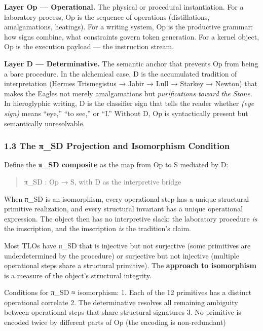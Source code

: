 \textbf{Layer Op --- Operational.} The physical or procedural
instantiation. For a laboratory process, Op is the sequence of
operations (distillations, amalgamations, heatings). For a writing
system, Op is the productive grammar: how signs combine, what
constraints govern token generation. For a kernel object, Op is the
execution payload --- the instruction stream.

\textbf{Layer D --- Determinative.} The semantic anchor that prevents Op
from being a bare procedure. In the alchemical case, D is the
accumulated tradition of interpretation (Hermes Trismegistus → Jabir →
Lull → Starkey → Newton) that makes the Eagles not merely amalgamations
but \emph{purifications toward the Stone}. In hieroglyphic writing, D is
the classifier sign that tells the reader whether \emph{(eye sign)} means ``eye,'' ``to
see,'' or ``I.'' Without D, Op is syntactically present but semantically
unresolvable.

\subsubsection{1.3 The π\_SD Projection and Isomorphism
Condition}\label{the-ux3c0_sd-projection-and-isomorphism-condition}

Define the \textbf{π\_SD composite} as the map from Op to S mediated by
D:

\begin{quote}
π\_SD : Op → S, with D as the interpretive bridge
\end{quote}

When π\_SD is an isomorphism, every operational step has a unique
structural primitive realization, and every structural invariant has a
unique operational expression. The object then has no interpretive
slack: the laboratory procedure \emph{is} the imscription, and the
imscription \emph{is} the tradition's claim.

Most TLOs have π\_SD that is injective but not surjective (some
primitives are underdetermined by the procedure) or surjective but not
injective (multiple operational steps share a structural primitive). The
\textbf{approach to isomorphism} is a measure of the object's structural
integrity.

Conditions for π\_SD ≈ isomorphism: 1. Each of the 12 primitives has a
distinct operational correlate 2. The determinative resolves all
remaining ambiguity between operational steps that share structural
signatures 3. No primitive is encoded twice by different parts of Op
(the encoding is non-redundant)

